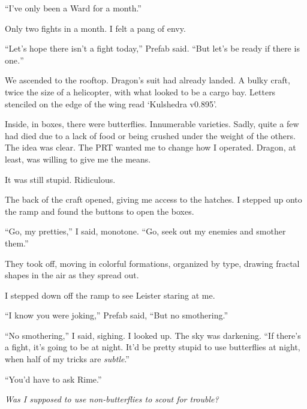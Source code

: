 ``I've only been a Ward for a month.''



Only two fights in a month.  I felt a pang of envy.



``Let's hope there isn't a fight today,'' Prefab said.  ``But let's be ready if there is one\emph{.}''



We ascended to the rooftop.  Dragon's suit had already landed.  A bulky craft, twice the size of a helicopter, with what looked to be a cargo bay.  Letters stenciled on the edge of the wing read `Kulshedra v0.895'.



Inside, in boxes, there were butterflies.  Innumerable varieties.  Sadly, quite a few had died due to a lack of food or being crushed under the weight of the others.  The idea was clear.  The PRT wanted me to change how I operated.  Dragon, at least, was willing to give me the means.



It was still stupid.  Ridiculous.



The back of the craft opened, giving me access to the hatches.  I stepped up onto the ramp and found the buttons to open the boxes.



``Go, my pretties,'' I said, monotone.  ``Go, seek out my enemies and smother them.''



They took off, moving in colorful formations, organized by type, drawing fractal shapes in the air as they spread out.



I stepped down off the ramp to see Leister staring at me.



``I know you were joking,'' Prefab said, ``But no smothering.''



``No smothering,'' I said, sighing.  I looked up.  The sky was darkening.  ``If there's a fight, it's going to be at night.  It'd be pretty stupid to use butterflies at night, when half of my tricks are \emph{subtle}.''



``You'd have to ask Rime.''



\emph{Was I supposed to use non-butterflies to scout for trouble?}



